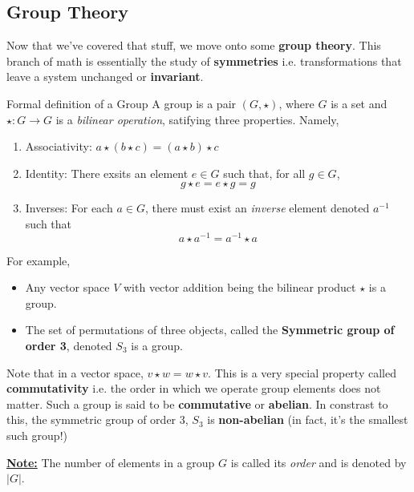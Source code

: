 \documentclass{article}
\begin{document}
\vskip 1cm
\subsection{Group Theory}

\vskip 0.5cm
Now that we've covered that stuff, we move onto some \textbf{group theory}. This branch of math is essentially the study of \textbf{symmetries} i.e. transformations that leave a system unchanged or \textbf{invariant}.

\vskip 0.5cm
\begin{mathdefinitionbox}{Formal definition of a Group}
  \vskip 0.5cm
  A group is a pair $(G, \star)$, where $G$ is a set and $\star : G \rightarrow G$ is a \emph{bilinear operation}, satifying three properties. Namely, 
  \begin{enumerate}[label=(\alph*)]
    \item Associativity: $a \star ( b \star c) = (a \star b) \star c$ 
    
    \item Identity: There exsits an element $e \in G$ such that, for all $g \in G$,
    \[ g \star e = e \star g = g \]

    \item Inverses: For each $a \in G$, there must exist an \emph{inverse} element denoted $a^{-1}$ such that 
    \[ a \star a^{-1} = a^{-1} \star a \]
  \end{enumerate}
\end{mathdefinitionbox}

\vskip 0.5cm
For example,
\begin{itemize}
  \item Any vector space $V$ with vector addition being the bilinear product $\star$ is a group.
  \item The set of permutations of three objects, called the \textbf{Symmetric group of order 3}, denoted $S_3$ is a group.
\end{itemize}

\vskip 0.5cm
Note that in a vector space, $v \star w = w \star v$. This is a very special property called \textbf{commutativity} i.e. the order in which we operate group elements does not matter. Such a group is said to be \textbf{commutative} or \textbf{abelian}. In constrast to this, the symmetric group of order 3, $S_3$ is \textbf{non-abelian} (in fact, it's the smallest such group!)

\vskip 0.5cm
\underline{\textbf{Note:}} The number of elements in a group $G$ is called its \emph{order} and is denoted by $\lvert G \rvert$.
\end{document}
